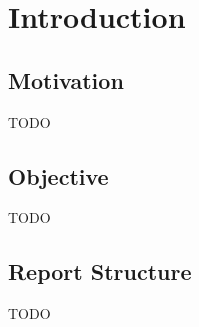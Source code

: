 
\chapter{Introduction}
\section{Motivation}
TODO
\section{Objective}
TODO
\section{Report Structure}
TODO
